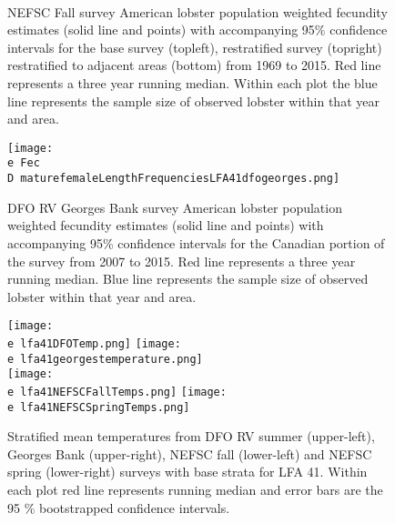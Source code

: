 \documentclass[11pt]{article}
\newcommand{\D}{.}
\newcommand{\e}{/backup/bio_data/bio.lobster/figures/} %
\begin{document}
\begin{figure}
\centering
{}
\\
\caption{NEFSC Fall survey American lobster population weighted fecundity estimates (solid line and points) with accompanying 95\% confidence intervals for the base survey (topleft), restratified survey (topright) restratified to adjacent areas (bottom) from 1969 to 2015. Red line represents a three year running median. Within each plot the blue line represents the sample size of observed lobster within that year and area. }
\end{figure}
\clearpage


\begin{figure}

    \texttt{[image: \\e Fec\\D maturefemaleLengthFrequenciesLFA41dfogeorges.png]}
    \caption{DFO RV Georges Bank survey American lobster population weighted fecundity estimates (solid line and points) with accompanying 95\% confidence intervals for the Canadian portion of the survey from 2007 to 2015. Red line represents a three year running median. Blue line represents the sample size of observed lobster within that year and area.}

\end{figure}



\begin{figure}

    \texttt{[image: \\e lfa41DFOTemp.png]}
    \texttt{[image: \\e lfa41georgestemperature.png]}\\
    \texttt{[image: \\e lfa41NEFSCFallTemps.png]}
    \texttt{[image: \\e lfa41NEFSCSpringTemps.png]}\\
    \caption{Stratified mean temperatures from DFO RV summer (upper-left), Georges Bank (upper-right), NEFSC fall (lower-left) and NEFSC spring (lower-right) surveys with base strata for LFA 41. Within each plot red line represents running median and error bars are the 95 \% bootstrapped confidence intervals.}

\end{figure}
\end{document}
